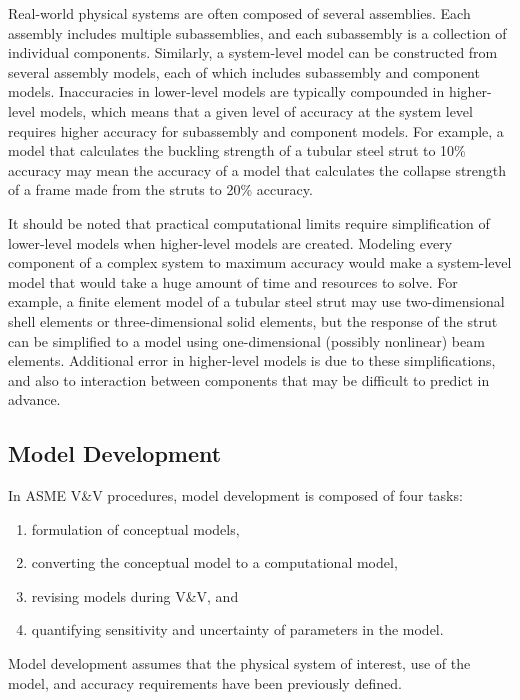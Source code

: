 Real-world physical systems are often composed of several assemblies.
Each assembly includes multiple subassemblies, and each subassembly is a collection of individual components.
Similarly, a system-level model can be constructed from several assembly models, each of which includes subassembly and component models.
Inaccuracies in lower-level models are typically compounded in higher-level models, which means that a given level of accuracy at the system level requires higher accuracy for subassembly and component models.
For example, a model that calculates the buckling strength of a tubular steel strut to 10\% accuracy may mean the accuracy of a model that calculates the collapse strength of a frame made from the struts to 20\% accuracy.

It should be noted that practical computational limits require simplification of lower-level models when higher-level models are created.
Modeling every component of a complex system to maximum accuracy would make a system-level model that would take a huge amount of time and resources to solve.
For example, a finite element model of a tubular steel strut may use two-dimensional shell elements or three-dimensional solid elements, but the response of the strut can be simplified to a model using one-dimensional (possibly nonlinear) beam elements.
Additional error in higher-level models is due to these simplifications, and also to interaction between components that may be difficult to predict in advance.

\subsection{Model Development}

In ASME V\&V procedures, model development is composed of four tasks:
\begin{enumerate}
\item formulation of conceptual models,
\item converting the conceptual model to a computational model,
\item revising models during V\&V,
and 
\item quantifying sensitivity and uncertainty of parameters in the model.
\end{enumerate}
Model development assumes that the physical system of interest, use of the model, and accuracy requirements have been previously defined.

